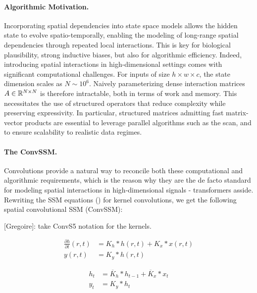 \documentclass{article}
\newcommand{\greg}[1]{{\color{indigo}[Gregoire]: #1}}
\begin{document}
\paragraph{Algorithmic Motivation.} 
Incorporating spatial dependencies into state space models allows the hidden state to evolve spatio-temporally, enabling the modeling of long-range spatial dependencies through repeated local interactions. This is key for biological plausibility, strong inductive biases, but also for algorithmic efficiency.
%
Indeed, introducing spatial interactions in high-dimensional settings comes with significant computational challenges. For inputs of size $h \!\times\! w \!\times\! c$, the state dimension scales as $N \sim 10^6$. Naively parameterizing dense interaction matrices $A \in \mathbb{R}^{N \times N}$ is therefore intractable, both in terms of work and memory.
%
This necessitates the use of structured operators that reduce complexity while preserving expressivity. In particular, structured matrices admitting fast matrix-vector products are essential to leverage parallel algorithms such as the scan, and to ensure scalability to realistic data regimes.

\paragraph{The ConvSSM.}
Convolutions provide a natural way to reconcile both these computational and algorithmic requirements, which is the reason why they are the de facto standard for modeling spatial interactions in high-dimensional signals - transformers asside. Rewriting the SSM equations () for kernel convolutions, we get the following spatial convolutional SSM (ConvSSM):

\greg{take ConvS5 notation for the kernels.}

\begin{minipage}[t]{.45\linewidth}
\vspace{-5mm}
  \begin{subequations}
    \label{eq:conv_ssm_continuous}
    \begin{align}
    \label{eq:conv_ssm_continuous:1}
      \frac{\partial h}{\partial t}(r,t) &= K_h \ast h(r, t) + K_x \ast x(r, t) \\
      y(r, t) &= K_y \ast h(r, t)
    \end{align}
  \end{subequations}
\vspace{-5mm}
\end{minipage}%
\begin{minipage}[t]{.45\linewidth}
\vspace{-5mm}
  \begin{subequations}
    \label{eq:conv_ssm_discrete}
    \begin{align}
    \label{eq:conv_ssm_discrete:1}
      h_{t} &= \overline{K}_h \ast h_{t-1} + \overline{K}_x \ast x_t \\
    \label{eq:conv_ssm_discrete:2}
      y_t &= K_y \ast h_t
    \end{align}
  \end{subequations}
\vspace{-5mm}
\end{minipage}
\end{document}

